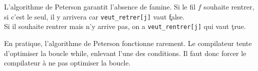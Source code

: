 \documentclass[french, 11pt]{article}
\begin{document}
\vspace*{-0.7cm}

\begin{prop}{}{}
    L'algorithme de Peterson garantit l'absence de famine.
    \tcblower
    Si le fil $f$ souhaite rentrer, si c'est le seul, il y arrivera car \texttt{veut\_retrer[j]} vaut \c{false}.\\
    Si il souhaite rentrer mais n'y arrive pas, on a \texttt{veut\_rentrer[j]} qui vaut \c{true}.
\end{prop}

\vspace*{-0.7cm}

\begin{prop}{}{}
    En pratique, l'algorithme de Peterson fonctionne rarement.
    \tcblower
    Le compilateur tente d'optimiser la boucle while, enlevant l'une des conditions. Il faut donc forcer le compilateur à ne pas optimiser la boucle.
\end{prop}
\end{document}

